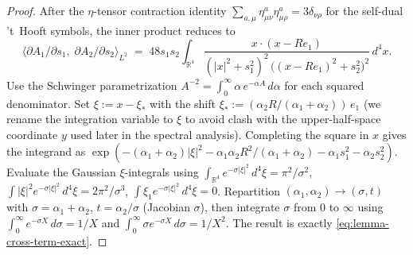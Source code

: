\documentclass[11pt,letterpaper]{article}
\theoremstyle{definition}
\newcommand{\bbR}{\mathbb{R}}
\begin{document}
\begin{proof}
After the $\eta$-tensor contraction identity $\sum_{a,\mu} \eta^a_{\mu\nu}\eta^a_{\mu\rho} = 3\delta_{\nu\rho}$ for the self-dual 't~Hooft symbols, the inner product reduces to
\[
\langle \partial A_1/\partial s_1,\;\partial A_2/\partial s_2\rangle_{L^2}
\;=\; 48 s_1 s_2 \int_{\bbR^4} \frac{x \cdot (x - R e_1)}{(|x|^2 + s_1^2)^2\,\bigl((x - R e_1)^2 + s_2^2\bigr)^2}\,d^4 x.
\]
Use the Schwinger parametrization $A^{-2} = \int_0^\infty \alpha\,e^{-\alpha A}\,d\alpha$ for each squared denominator. Set $\xi := x - \xi_*$ with the shift $\xi_* := (\alpha_2 R/(\alpha_1+\alpha_2))\,e_1$ (we rename the integration variable to $\xi$ to avoid clash with the upper-half-space coordinate $y$ used later in the spectral analysis). Completing the square in $x$ gives the integrand as $\exp(-(\alpha_1+\alpha_2)|\xi|^2 - \alpha_1\alpha_2 R^2/(\alpha_1+\alpha_2) - \alpha_1 s_1^2 - \alpha_2 s_2^2)$. Evaluate the Gaussian $\xi$-integrals using $\int_{\bbR^4} e^{-\sigma|\xi|^2}\,d^4\xi = \pi^2/\sigma^2$, $\int |\xi|^2 e^{-\sigma|\xi|^2}\,d^4\xi = 2\pi^2/\sigma^3$, $\int \xi_1 e^{-\sigma|\xi|^2}\,d^4\xi = 0$. Repartition $(\alpha_1, \alpha_2) \to (\sigma, t)$ with $\sigma = \alpha_1+\alpha_2$, $t = \alpha_2/\sigma$ (Jacobian $\sigma$), then integrate $\sigma$ from $0$ to $\infty$ using $\int_0^\infty e^{-\sigma X}\,d\sigma = 1/X$ and $\int_0^\infty \sigma e^{-\sigma X}\,d\sigma = 1/X^2$. The result is exactly \eqref{eq:lemma-cross-term-exact}.


\end{proof}
\end{document}
